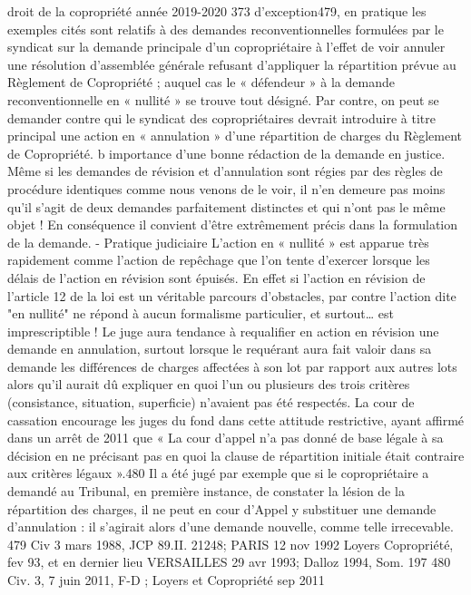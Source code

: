 droit de la copropriété année 2019-2020
373
d'exception479, en pratique les exemples cités sont relatifs à des demandes reconventionnelles formulées par le syndicat sur la demande principale d'un copropriétaire à l'effet de voir annuler une résolution d’assemblée générale refusant d'appliquer la répartition prévue au Règlement de Copropriété ; auquel cas le « défendeur » à la demande reconventionnelle en « nullité » se trouve tout désigné. Par contre, on peut se demander contre qui le syndicat des copropriétaires devrait introduire à titre principal une action en « annulation » d’une répartition de charges du Règlement de Copropriété.
b importance d'une bonne rédaction de la demande en justice.
Même si les demandes de révision et d'annulation sont régies par des règles de procédure identiques comme nous venons de le voir, il n'en demeure pas moins qu'il s'agit de deux demandes parfaitement distinctes et qui n'ont pas le même objet !
En conséquence il convient d'être extrêmement précis dans la formulation de la demande.
- Pratique judiciaire
L'action en « nullité » est apparue très rapidement comme l’action de repêchage que l'on tente d'exercer lorsque les délais de l'action en révision sont épuisés.
En effet si l'action en révision de l'article 12 de la loi est un véritable parcours d'obstacles, par contre l'action dite "en nullité" ne répond à aucun formalisme particulier, et surtout… est imprescriptible !
Le juge aura tendance à requalifier en action en révision une demande en annulation, surtout lorsque le requérant aura fait valoir dans sa demande les différences de charges affectées à son lot par rapport aux autres lots alors qu’il aurait dû expliquer en quoi l’un ou plusieurs des trois critères (consistance, situation, superficie) n’avaient pas été respectés.
La cour de cassation encourage les juges du fond dans cette attitude restrictive, ayant affirmé dans un arrêt de 2011 que « La cour d’appel n’a pas donné de base légale à sa décision en ne précisant pas en quoi la clause de répartition initiale était contraire aux critères légaux ».480
Il a été jugé par exemple que si le copropriétaire a demandé au Tribunal, en première instance, de constater la lésion de la répartition des charges, il ne peut en cour d'Appel y substituer une demande d'annulation : il s'agirait alors d'une demande nouvelle, comme telle irrecevable.
479 Civ 3 mars 1988, JCP 89.II. 21248; PARIS 12 nov 1992 Loyers Copropriété, fev 93,  et en dernier lieu VERSAILLES 29 avr 1993; Dalloz 1994, Som. 197
480 Civ. 3\degres, 7 juin 2011, F-D ; Loyers et Copropriété sep 2011 
